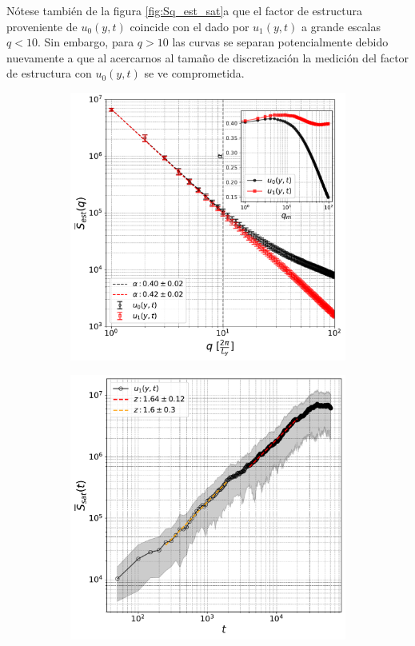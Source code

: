 Nótese también de la figura \ref{fig:Sq_est_sat}a que el factor de estructura proveniente de $u_0(y,t)$ coincide con el dado por $u_1(y,t)$ a grande escalas $q<10$. Sin embargo, para $q>10$ las curvas se separan potencialmente debido nuevamente a que al acercarnos al tamaño de discretización la medición del factor de estructura con $u_0(y,t)$ se ve comprometida.

\begin{figure}[t]
\hspace*{-1.5cm}
\begin{subfigure}{0.55\textwidth}
    \centering
    \includegraphics[width=\textwidth]{Sq_est.pdf}
    \caption{}
\end{subfigure}    
\begin{subfigure}{0.55\textwidth}
    \centering
    \includegraphics[width=\textwidth]{Sq_sat.pdf}

\end{subfigure}
\end{figure}

